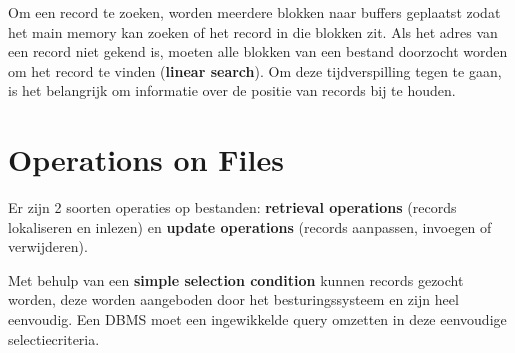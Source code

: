 Om een record te zoeken, worden meerdere blokken naar buffers geplaatst zodat het main memory kan zoeken of het record in die blokken zit. Als het adres van een record niet gekend is, moeten alle blokken van een bestand doorzocht worden om het record te vinden (\textbf{linear search}). Om deze tijdverspilling tegen te gaan, is het belangrijk om informatie over de positie van records bij te houden.



\section{Operations on Files}
Er zijn 2 soorten operaties op bestanden: \textbf{retrieval operations} (records lokaliseren en inlezen) en \textbf{update operations} (records aanpassen, invoegen of verwijderen).

Met behulp van een \textbf{simple selection condition} kunnen records gezocht worden, deze worden aangeboden door het besturingssysteem en zijn heel eenvoudig. Een DBMS moet een ingewikkelde query omzetten in deze eenvoudige selectiecriteria.

~

